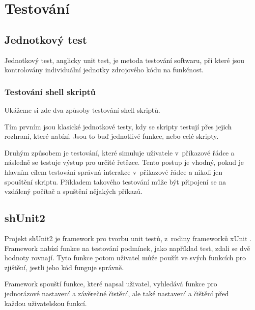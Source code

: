 \documentclass[thesis=M,czech]{FITthesis}[2012/06/26]
\begin{document}
%
%
\chapter{Testování}

%
\section{Jednotkový test}

Jednotkový test, anglicky unit test, je metoda testování softwaru, při které jsou kontrolovány individuální jednotky zdrojového kódu na funkčnost.

%
\subsection{Testování shell skriptů}

Ukážeme si zde dva způsoby testování shell skriptů.

Tím prvním jsou klasické jednotkové testy, kdy se skripty testují přes jejich rozhraní, které nabízí. Jsou to buď jednotlivé funkce, nebo celé skripty.

Druhým způsobem je testování, které simuluje uživatele v~příkazové řádce a následně se testuje výstup pro určité řetězce. Tento postup je vhodný, pokud je hlavním cílem testování správná interakce v~příkazové řádce a nikoli jen spouštění skriptu. Příkladem takového testování může být připojení se na vzdálený počítač a spuštění nějakých příkazů.



\section{shUnit2}

Projekt shUnit2 \cite{shunit2} je framework pro tvorbu unit testů, z~rodiny frameworků xUnit \cite{xunit}. Framework nabízí funkce na testování podmínek, jako například test, zdali se dvě hodnoty rovnají. Tyto funkce potom uživatel může použít ve svých funkcích pro zjištění, jestli jeho kód funguje správně.

Framework spouští funkce, které napsal uživatel, vyhledává funkce pro jednorázové nastavení a závěrečné čistění, ale také nastavení a čištění před každou uživatelskou funkcí.
\end{document}
